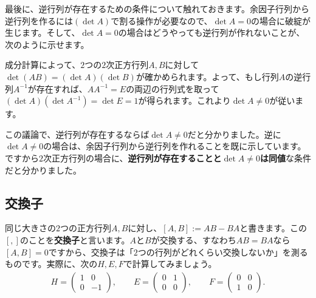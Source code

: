 最後に、逆行列が存在するための条件について触れておきます。余因子行列から逆行列を作るには$(\det A)$で割る操作が必要なので、$\det A = 0$の場合に破綻が生じます。そして、$\det A = 0$の場合はどうやっても逆行列が作れないことが、次のように示せます。

成分計算によって、$2$つの$2$次正方行列$A, B$に対して$\det (AB) = (\det A)(\det B)$が確かめられます。よって、もし行列$A$の逆行列$A^{-1}$が存在すれば、$A A^{-1} = E$の両辺の行列式を取って$(\det A)(\det A^{-1}) = \det E =1$が得られます。これより$\det A \neq 0$が従います。

この議論で、逆行列が存在するならば$\det A \neq 0$だと分かりました。逆に$\det A \neq 0$の場合は、余因子行列から逆行列を作れることを既に示しています。ですから$2$次正方行列の場合に、\textbf{逆行列が存在することと$\det A \neq 0$は同値}な条件だと分かりました。

\subsection{交換子}
同じ大きさの$2$つの正方行列$A, B$に対し、$[A, B] := AB - BA$と書きます。この$[,]$のことを\textbf{交換子}と言います。$A$と$B$が交換する、すなわち$AB = BA$なら$[A, B] = 0$ですから、交換子は「$2$つの行列がどれくらい交換しないか」を測るものです。実際に、次の$H, E, F$で計算してみましょう。
\begin{align*}
H =
\begin{pmatrix}
1 & 0 \\
0 & -1
\end{pmatrix}, \qquad
E =
\begin{pmatrix}
0 & 1 \\
0 & 0
\end{pmatrix}, \qquad
F =
\begin{pmatrix}
0 & 0 \\
1 & 0
\end{pmatrix}.
\end{align*}

